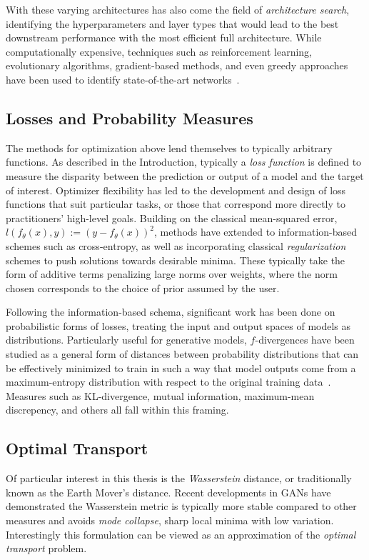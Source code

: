 With these varying architectures
has also come the field of \textit{architecture search},
identifying the hyperparameters and layer types
that would lead to the best downstream performance
with the most efficient full architecture.
While computationally expensive, techniques
such as reinforcement learning, evolutionary algorithms,
gradient-based methods, and even greedy approaches
have been used to identify state-of-the-art networks~\citep{elsken2019neural}.

\subsection{Losses and Probability Measures}
The methods for optimization above
lend themselves to typically arbitrary functions.
As described in the Introduction,
typically a \textit{loss function}
is defined to measure the disparity
between the prediction or output of a model
and the target of interest.
Optimizer flexibility has led
to the development and design of loss functions
that suit particular tasks,
or those that correspond more directly
to practitioners' high-level goals.
Building on the classical mean-squared error,
$l(f_\theta(x), y) := (y - f_\theta(x))^2$,
methods have extended to information-based schemes
such as cross-entropy, as well as 
incorporating classical \textit{regularization} schemes
to push solutions towards desirable minima.
These typically take the form of additive terms 
penalizing large norms over weights, where
the norm chosen corresponds to the choice of 
prior assumed by the user.

Following the information-based schema,
significant work has been done
on probabilistic forms of losses,
treating the input and output spaces
of models as distributions.
Particularly useful for generative models,
$f$-divergences have been studied
as a general form of distances
between probability distributions
that can be effectively minimized to
train in such a way that model outputs
come from a maximum-entropy distribution
with respect to the original training data~\citep{fgan}.
Measures such as KL-divergence, mutual information,
maximum-mean discrepency, and others all fall within
this framing.

\subsection{Optimal Transport}	
Of particular interest in this thesis is the \textit{Wasserstein} distance,
or traditionally known as the Earth Mover's distance.
Recent developments in GANs \citep{wgan} have demonstrated
the Wasserstein metric is typically more stable
compared to other measures and avoids
\textit{mode collapse}, sharp local minima 
with low variation. Interestingly
this formulation can be viewed as an approximation
of the \textit{optimal transport} problem.

